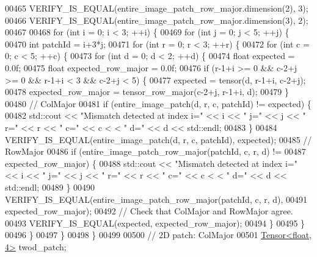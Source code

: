 \begin{DoxyCode}
00465   VERIFY\_IS\_EQUAL(entire\_image\_patch\_row\_major.dimension(2), 3);
00466   VERIFY\_IS\_EQUAL(entire\_image\_patch\_row\_major.dimension(3), 2);
00467 
00468   \textcolor{keywordflow}{for} (\textcolor{keywordtype}{int} i = 0; i < 3; ++i) \{
00469     \textcolor{keywordflow}{for} (\textcolor{keywordtype}{int} j = 0; j < 5; ++j) \{
00470       \textcolor{keywordtype}{int} patchId = i+3*j;
00471       \textcolor{keywordflow}{for} (\textcolor{keywordtype}{int} r = 0; r < 3; ++r) \{
00472         \textcolor{keywordflow}{for} (\textcolor{keywordtype}{int} c = 0; c < 5; ++c) \{
00473           \textcolor{keywordflow}{for} (\textcolor{keywordtype}{int} d = 0; d < 2; ++d) \{
00474             \textcolor{keywordtype}{float} expected = 0.0f;
00475             \textcolor{keywordtype}{float} expected\_row\_major = 0.0f;
00476             \textcolor{keywordflow}{if} (r-1+i >= 0 && c-2+j >= 0 && r-1+i < 3 && c-2+j < 5) \{
00477               expected = tensor(d, r-1+i, c-2+j);
00478               expected\_row\_major = tensor\_row\_major(c-2+j, r-1+i, d);
00479             \}
00480             \textcolor{comment}{// ColMajor}
00481             \textcolor{keywordflow}{if} (entire\_image\_patch(d, r, c, patchId) != expected) \{
00482               std::cout << \textcolor{stringliteral}{"Mismatch detected at index i="} << i << \textcolor{stringliteral}{" j="} << j << \textcolor{stringliteral}{" r="} << r << \textcolor{stringliteral}{" c="} << c <
      < \textcolor{stringliteral}{" d="} << d << std::endl;
00483             \}
00484             VERIFY\_IS\_EQUAL(entire\_image\_patch(d, r, c, patchId), expected);
00485             \textcolor{comment}{// RowMajor}
00486             \textcolor{keywordflow}{if} (entire\_image\_patch\_row\_major(patchId, c, r, d) !=
00487                 expected\_row\_major) \{
00488               std::cout << \textcolor{stringliteral}{"Mismatch detected at index i="} << i << \textcolor{stringliteral}{" j="} << j << \textcolor{stringliteral}{" r="} << r << \textcolor{stringliteral}{" c="} << c <
      < \textcolor{stringliteral}{" d="} << d << std::endl;
00489             \}
00490             VERIFY\_IS\_EQUAL(entire\_image\_patch\_row\_major(patchId, c, r, d),
00491                             expected\_row\_major);
00492             \textcolor{comment}{// Check that ColMajor and RowMajor agree.}
00493             VERIFY\_IS\_EQUAL(expected, expected\_row\_major);
00494           \}
00495         \}
00496       \}
00497     \}
00498   \}
00499 
00500   \textcolor{comment}{// 2D patch: ColMajor}
00501   \hyperlink{class_eigen_1_1_tensor}{Tensor<float, 4>} twod\_patch;

\end{DoxyCode}
